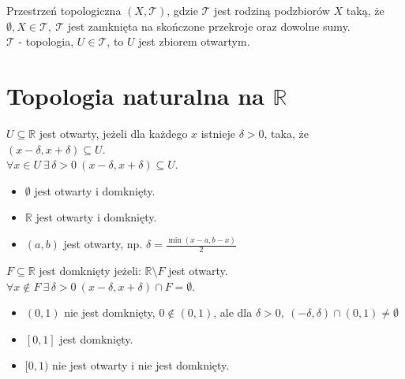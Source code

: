 \begin{df} 
    Przestrzeń topologiczna $(X,\mathcal{T})$, gdzie $\mathcal{T}$ jest rodziną podzbiorów $X$
    taką, że $\emptyset,X \in \mathcal{T}, \ \mathcal{T}$ jest zamknięta na skończone przekroje oraz 
    dowolne sumy. \\
    $\mathcal{T}$ - topologia, $U \in \mathcal {T}$, to $U$ jest zbiorem otwartym.
\end{df} 
\section{Topologia naturalna na $\mathbb{R}$ }
\begin{df}
    $ U \subseteq \mathbb{R}$ jest otwarty, jeżeli dla każdego $x$ istnieje $\delta > 0$, taka, że $(x - \delta, x+\delta) \subseteq U$. \\
    $ \forall x \in U \ \exists \, \delta > 0 \ (x-\delta,x+\delta) \subseteq U $.
\end{df}
\begin{minipage}[c]{0.5\linewidth}
\begin{przy} \hfill 
    \begin{itemize} 
        \item $\emptyset$ jest otwarty i domknięty.
        \item $\mathbb{R}$ jest otwarty i domknięty.
        \item $(a,b)$ jest otwarty, np. $\delta = \frac{\min(x-a,b-x)}{2}$
    \end{itemize} 
\end{przy} 
\end{minipage}
\begin{minipage}[b]{0.4\linewidth}
\end{minipage} 
\begin{df} 
    $ F \subseteq \mathbb{R} $ jest domknięty jeżeli: $\mathbb{R} \setminus F$ jest otwarty. 
    $ \forall x \notin F \ \exists \, \delta > 0 \ ( x - \delta, x + \delta ) \cap F = \emptyset $.
\end{df} 
\begin{przy} \hfill
    \begin{itemize} 
        \item $(0,1)$ nie jest domknięty, $0 \notin (0,1)$, ale dla $\delta > 0, \ (-\delta,\delta) 
                \cap (0,1) \neq \emptyset$
        \item $[0,1]$ jest domknięty.
        \item $[0,1)$ nie jest otwarty i nie jest domknięty.
    \end{itemize} 
\end{przy}
